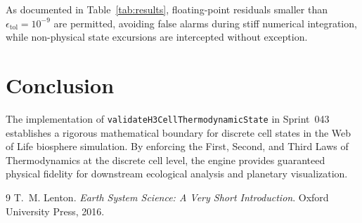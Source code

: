 \documentclass[10pt,twocolumn,letterpaper]{article}
\begin{document}
As documented in Table~\ref{tab:results}, floating-point residuals smaller than $\epsilon_{\text{tol}} = 10^{-9}$ are permitted, avoiding false alarms during stiff numerical integration, while non-physical state excursions are intercepted without exception.

\section{Conclusion}
The implementation of \texttt{validateH3CellThermodynamicState} in Sprint~043 establishes a rigorous mathematical boundary for discrete cell states in the Web of Life biosphere simulation. By enforcing the First, Second, and Third Laws of Thermodynamics at the discrete cell level, the engine provides guaranteed physical fidelity for downstream ecological analysis and planetary visualization.

\begin{thebibliography}{9}
T.~M. Lenton.
\newblock \textit{Earth System Science: A Very Short Introduction}.
\newblock Oxford University Press, 2016.
\end{thebibliography}
\end{document}
